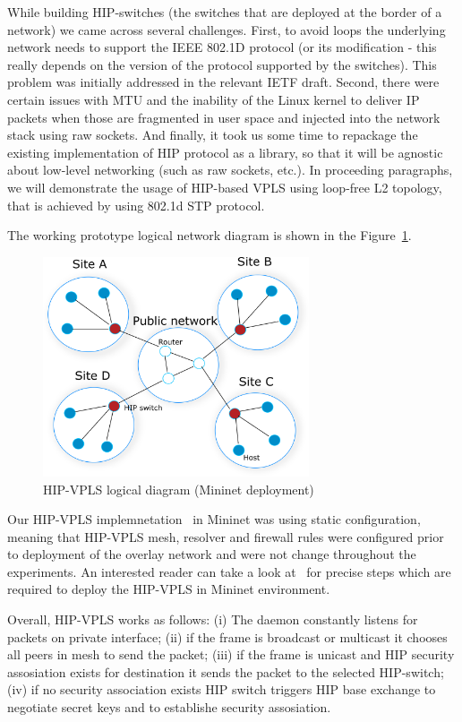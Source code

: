 While building HIP-switches (the switches that are deployed at the border of a network) 
we came across several challenges. First, to avoid loops the underlying network needs to support 
the IEEE 802.1D protocol (or its modification - this really depends on the version of the protocol 
supported by the switches). This problem was initially addressed in the relevant IETF draft. 
Second, there were certain issues with MTU and the inability of the Linux kernel to deliver IP 
packets when those are fragmented in user space and injected into the network stack using raw 
sockets. And finally, it took us some time to repackage the existing implementation of HIP protocol 
as a library, so that it will be agnostic about low-level networking (such as raw sockets, etc.). 
In proceeding paragraphs, we will demonstrate the usage of HIP-based VPLS using loop-free L2 topology,
that is achieved by using 802.1d STP protocol.

The working prototype logical network diagram is shown in the Figure~\ref{fig:mininet}.

\begin{figure}[h!]
    \centering
    \includegraphics[width=0.7\textwidth]{graphics/mininet.png}
    \caption{HIP-VPLS logical diagram (Mininet deployment)}
    \label{fig:mininet}
\end{figure}

Our HIP-VPLS implemnetation~\cite{hip-vpls:mininet} in Mininet was using static configuration, meaning that 
HIP-VPLS mesh, resolver and firewall rules were configured prior to deployment 
of the overlay network and were not change throughout the experiments. An interested reader
can take a look at~\cite{hip-vpls:mininet} for precise steps which are required to 
deploy the HIP-VPLS in Mininet environment.

Overall, HIP-VPLS works as follows: (i) The daemon constantly listens for packets on private interface;
(ii) if the frame is broadcast or multicast it chooses all peers in mesh to send the packet; (iii) if the 
frame is unicast and HIP security assosiation exists for destination it sends the packet to the selected
HIP-switch; (iv) if no security association exists HIP switch triggers HIP base exchange to negotiate 
secret keys and to establishe security assosiation.

